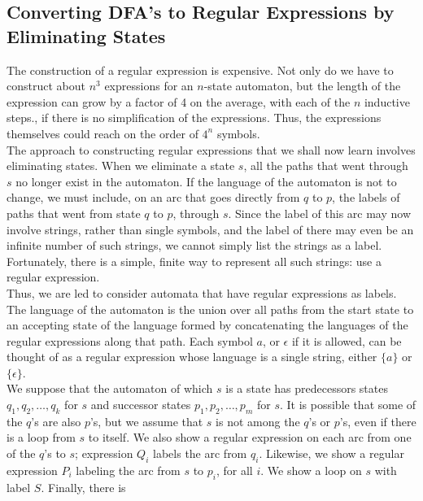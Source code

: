 \documentclass[]{article}
\begin{document}
  \subsection*{Converting DFA's to Regular Expressions by Eliminating States}
    The construction of a regular expression is expensive. Not only do we have
    to construct about $n^3$ expressions for an $n$-state automaton, but the
    length of the expression can grow by a factor of 4 on the average, with each
    of the $n$ inductive steps., if there is no simplification of the
    expressions. Thus, the expressions themselves could reach on the order of
    $4^n$ symbols. \\
    \indent The approach to constructing regular expressions that we shall now
    learn involves eliminating states. When we eliminate a state $s$, all the
    paths that went through $s$ no longer exist in the automaton. If the
    language of the automaton is not to change, we must include, on an arc that
    goes directly from $q$ to $p$, the labels of paths that went from state $q$
    to $p$, through $s$. Since the label of this arc may now involve strings,
    rather than single symbols, and the label of there may even be an infinite
    number of such strings, we cannot simply list the strings as a label.
    Fortunately, there is a simple, finite way to represent all such strings:
    use a regular expression. \\
    \indent Thus, we are led to consider automata that have regular expressions
    as labels. The language of the automaton is the union over all paths from
    the start state to an accepting state of the language formed by
    concatenating the languages of the regular expressions along that path. Each
    symbol $a$, or $\epsilon$ if it is allowed, can be thought of as a regular
    expression whose language is a single string, either $\{a\}$ or $\{\epsilon
    \}$. \\
    \indent We suppose that the automaton of which $s$ is a state has
    predecessors states $q_1, q_2, \ldots, q_k$ for $s$ and successor states
    $p_1,p_2,\ldots,p_m$ for $s$. It is possible that some of the $q$'s are also
    $p$'s, but we assume that $s$ is not among the $q$'s or $p$'s, even if there
    is a loop from $s$ to itself. We also show a regular expression on each arc
    from one of the $q$'s to $s$; expression $Q_i$ labels the arc from $q_i$.
    Likewise, we show a regular expression $P_i$ labeling the arc from $s$ to
    $p_i$, for all $i$. We show a loop on $s$ with label $S$. Finally, there is
\end{document}
